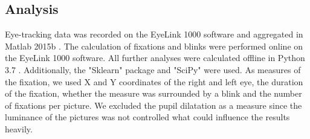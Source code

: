 \documentclass[a4paper,man,natbib,floatsintext]{apa6}
\begin{document}
\subsection{Analysis} Eye-tracking data was recorded on the EyeLink 1000 software and aggregated in Matlab 2015b \citep{Mathworks2015}.  The calculation of fixations and blinks were performed online on the EyeLink 1000 software. All further analyses were calculated offline in Python 3.7 \citep{Python2018}. Additionally, the "Sklearn" package \citep{Pedregosa2012b} and "SciPy" \citep{Oliphant2007} were used. %
As measures of the fixation, we used X and Y coordinates of the right and left eye, the duration of the fixation, whether the measure was surrounded by a blink and the number of fixations per picture. We excluded the pupil dilatation as a measure since the luminance of the pictures was not controlled what could influence the results heavily.\\
\end{document}
